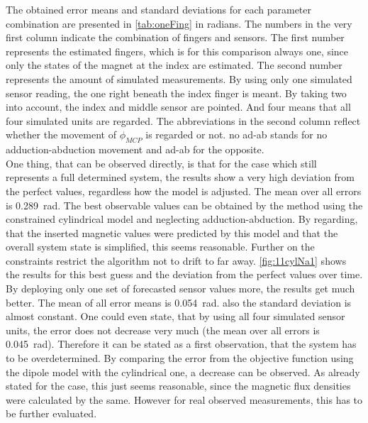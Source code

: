 The obtained error means and standard deviations for each parameter combination are presented in \ref{tab:oneFing} in radians. The numbers in the very first column indicate the combination of fingers and sensors. The first number represents the estimated fingers, which is for this comparison always one, since only the states of the magnet at the index are estimated. The second number represents the amount of simulated measurements. By using only one simulated sensor reading, the one right beneath the index finger is meant. By taking two into account, the index and middle sensor are pointed. And four means that all four simulated units are regarded. The abbreviations in the second column reflect whether the movement of $ \phi_{MCP} $ is regarded or not. \grqq no ad-ab \grqq stands for no adduction-abduction movement and \grqq ad-ab \grqq for the opposite. \\
One thing, that can be observed directly, is that for the case \grqq which still represents a full determined system, the results show a very high deviation from the perfect values, regardless how the model is adjusted. The mean over all errors is \SI{0.289}{\radian}. The best observable values can be obtained by the method using the constrained cylindrical model and neglecting adduction-abduction. By regarding, that the inserted magnetic values were predicted by this model and that the overall system state is simplified, this seems reasonable. Further on the constraints restrict the algorithm not to drift to far away. \ref{fig:11cylNa1} shows the results for this best guess and the deviation from the perfect values over time. 
By deploying only one set of forecasted sensor values more, the results get much better. The mean of all error means is \SI{0.054}{\radian}. also the standard deviation is almost constant. One could even state, that by using all four simulated sensor units, the error does not decrease very much (the mean over all errors is \SI{0.045}{\radian}). Therefore it can be stated as a first observation, that the system has to be overdetermined. 
By comparing the error from the objective function using the dipole model with the cylindrical one, a decrease can be observed. As already stated for the \grqq case, this just seems reasonable, since the magnetic flux densities were calculated by the same. However for real observed measurements, this has to be further evaluated.
